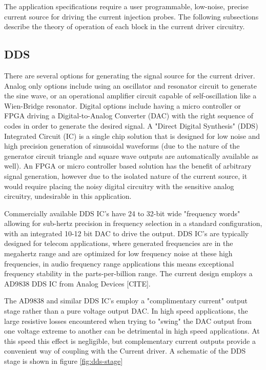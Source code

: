 The application specifications require a user programmable, low-noise, precise current source for driving the current injection probes. The following subsections describe the theory of operation of each block in the current driver circuitry. 

\subsection{DDS}
There are several options for generating the signal source for the current driver. Analog only options include using an oscillator and resonator circuit to generate the sine wave, or an operational amplifier circuit capable of self-oscillation like a Wien-Bridge resonator. Digital options include having a micro controller or FPGA driving a Digital-to-Analog Converter (DAC) with the right sequence of codes in order to generate the desired signal. A "Direct Digital Synthesis" (DDS) Integrated Circuit (IC) is a single chip solution that is designed for low noise and high precision generation of sinusoidal waveforms (due to the nature of the generator circuit triangle and square wave outputs are automatically available as well). An FPGA or micro controller based solution has the benefit of arbitrary signal generation, however due to the isolated nature of the current source, it would require placing the noisy digital circuitry with the sensitive analog circuitry, undesirable in this application. 

Commercially available DDS IC's have 24 to 32-bit wide "frequency words" allowing for sub-hertz precision in frequency selection in a standard configuration, with an integrated 10-12 bit DAC to drive the output. DDS IC's are typically designed for telecom applications, where generated frequencies are in the megahertz range and are optimized for low frequency noise at these high frequencies, in audio frequency range applications this means exceptional frequency stability in the parts-per-billion range. The current design employs a AD9838 DDS IC from Analog Devices [CITE].

The AD9838 and similar DDS IC's employ a "complimentary current" output stage rather than a pure voltage output DAC. In high speed applications, the large resistive losses encountered when trying to "swing" the DAC output from one voltage extreme to another can be detrimental in high speed applications. At this speed this effect is negligible, but complementary current outputs provide a convenient way of coupling with the Current driver. A schematic of the DDS stage is shown in figure \ref{fig:dds-stage}

